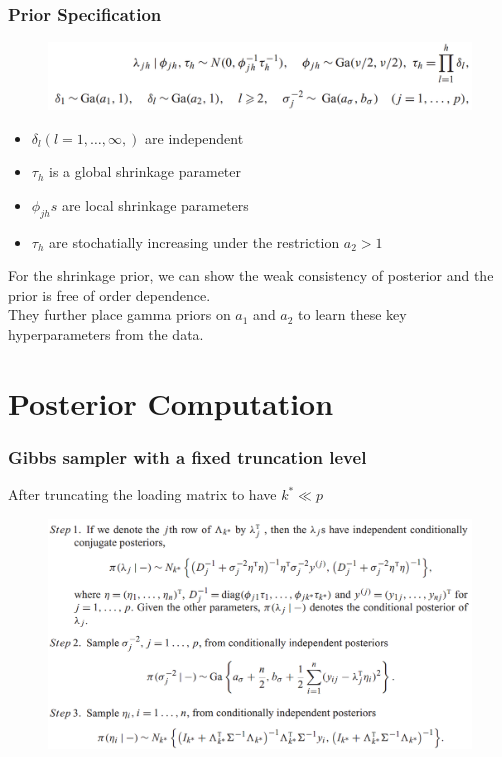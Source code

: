 \documentclass{beamer}
\begin{document}
	
	\begin{frame}
		\frametitle{Prior Specification}
		\begin{figure}
			\includegraphics[width=0.9\linewidth]{image001.png}
		\end{figure}
		\begin{itemize}
			\item 
			$\delta_l (l=1,\ldots,\infty,)$ are independent
			\item
			$\tau_h$ is a global shrinkage parameter
			\item
			$\phi_{jh}s$ are local shrinkage parameters
			\item
			$\tau_h$ are stochatially increasing under the restriction $a_2 >1$
		\end{itemize}
	For the shrinkage prior, we can show the weak consistency of posterior and the prior is free of order dependence.\\
	\vspace{\baselineskip}
	They further place gamma priors on $a_1$ and $a_2$ to learn these key hyperparameters from the data.
	\end{frame}
	
	\section{Posterior Computation}
	\begin{frame}
		\frametitle{Gibbs sampler with a fixed truncation level}
		After truncating the loading matrix to have $k^* \ll p$
		\begin{figure}
			\includegraphics[width=0.9\linewidth]{image002.png}
		\end{figure}
	\end{frame}
	
\end{document}
